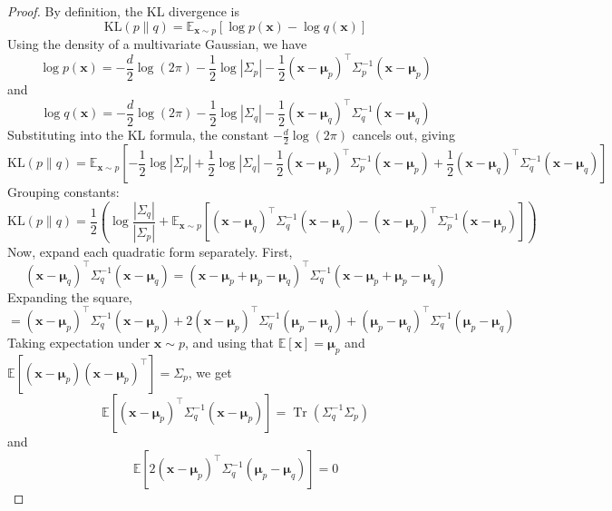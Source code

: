 \begin{proof}
    By definition, the KL divergence is
    \[
    \mathrm{KL}(p\|q) = \mathbb{E}_{\mathbf{x}\sim p} \left[ \log p(\mathbf{x}) - \log q(\mathbf{x}) \right]
    \]
    Using the density of a multivariate Gaussian, we have
    \[
    \log p(\mathbf{x}) = -\frac{d}{2}\log(2\pi) - \frac{1}{2}\log|\Sigma_p| - \frac{1}{2} (\mathbf{x} - \boldsymbol{\mu}_p)^\top \Sigma_p^{-1} (\mathbf{x} - \boldsymbol{\mu}_p)
    \]
    and
    \[
    \log q(\mathbf{x}) = -\frac{d}{2}\log(2\pi) - \frac{1}{2}\log|\Sigma_q| - \frac{1}{2} (\mathbf{x} - \boldsymbol{\mu}_q)^\top \Sigma_q^{-1} (\mathbf{x} - \boldsymbol{\mu}_q)
    \]
    Substituting into the KL formula, the constant $-\frac{d}{2}\log(2\pi)$ cancels out, giving
    \[
    \mathrm{KL}(p\|q) = \mathbb{E}_{\mathbf{x}\sim p} \left[ -\frac{1}{2}\log|\Sigma_p| + \frac{1}{2}\log|\Sigma_q| -\frac{1}{2} (\mathbf{x} - \boldsymbol{\mu}_p)^\top \Sigma_p^{-1} (\mathbf{x} - \boldsymbol{\mu}_p) + \frac{1}{2} (\mathbf{x} - \boldsymbol{\mu}_q)^\top \Sigma_q^{-1} (\mathbf{x} - \boldsymbol{\mu}_q) \right]
    \]
    Grouping constants:
    \[
    \mathrm{KL}(p\|q) = \frac{1}{2} \left( \log\frac{|\Sigma_q|}{|\Sigma_p|} + \mathbb{E}_{\mathbf{x}\sim p}\left[ (\mathbf{x} - \boldsymbol{\mu}_q)^\top \Sigma_q^{-1} (\mathbf{x} - \boldsymbol{\mu}_q) - (\mathbf{x} - \boldsymbol{\mu}_p)^\top \Sigma_p^{-1} (\mathbf{x} - \boldsymbol{\mu}_p) \right] \right)
    \]
    Now, expand each quadratic form separately. First,
    \[
    (\mathbf{x} - \boldsymbol{\mu}_q)^\top \Sigma_q^{-1} (\mathbf{x} - \boldsymbol{\mu}_q) = (\mathbf{x} - \boldsymbol{\mu}_p + \boldsymbol{\mu}_p - \boldsymbol{\mu}_q)^\top \Sigma_q^{-1} (\mathbf{x} - \boldsymbol{\mu}_p + \boldsymbol{\mu}_p - \boldsymbol{\mu}_q)
    \]
    Expanding the square,
    \[
    = (\mathbf{x} - \boldsymbol{\mu}_p)^\top \Sigma_q^{-1} (\mathbf{x} - \boldsymbol{\mu}_p) + 2(\mathbf{x} - \boldsymbol{\mu}_p)^\top \Sigma_q^{-1} (\boldsymbol{\mu}_p - \boldsymbol{\mu}_q) + (\boldsymbol{\mu}_p - \boldsymbol{\mu}_q)^\top \Sigma_q^{-1} (\boldsymbol{\mu}_p - \boldsymbol{\mu}_q)
    \]
    Taking expectation under $\mathbf{x}\sim p$, and using that $\mathbb{E}[\mathbf{x}] = \boldsymbol{\mu}_p$ and $\mathbb{E}[(\mathbf{x} - \boldsymbol{\mu}_p)(\mathbf{x} - \boldsymbol{\mu}_p)^\top] = \Sigma_p$, we get
    \[
    \mathbb{E}\left[ (\mathbf{x} - \boldsymbol{\mu}_p)^\top \Sigma_q^{-1} (\mathbf{x} - \boldsymbol{\mu}_p) \right] = \operatorname{Tr}(\Sigma_q^{-1} \Sigma_p)
    \]
    and
    \[
    \mathbb{E}\left[ 2(\mathbf{x} - \boldsymbol{\mu}_p)^\top \Sigma_q^{-1} (\boldsymbol{\mu}_p - \boldsymbol{\mu}_q) \right] = 0
\]
\end{proof}
